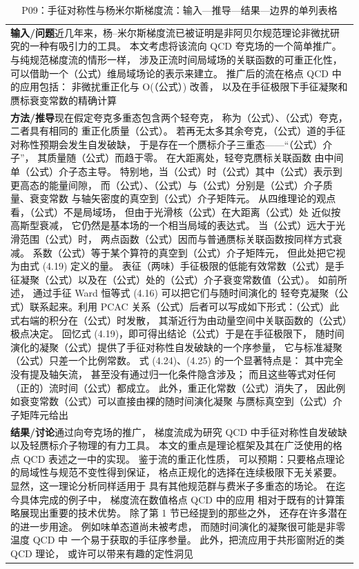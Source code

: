 \documentclass[UTF8,11pt,oneside]{ctexbook}
\begin{document}
\begin{table}[htbp]
  \centering
  \caption*{P09：手征对称性与杨米尔斯梯度流：输入—推导—结果—边界的单列表格}
  \small
  \begin{tabular}{@{}p{}@{}}
    \toprule
    \textbf{输入/问题}\quad 近几年来，杨–米尔斯梯度流已被证明是非阿贝尔规范理论非微扰研究的一种有吸引力的工具。 本文考虑将该流向 QCD 夸克场的一个简单推广。 与纯规范梯度流的情形一样， 涉及正流时间局域场的关联函数的可重正化性， 可以借助一个（公式）维局域场论的表示来建立。 推广后的流在格点 QCD 中的应用包括： 非微扰重正化与 O(（公式）) 改善， 以及在手征极限下手征凝聚和赝标衰变常数的精确计算 \\
    \textbf{方法/推导}\quad 现在假定夸克多重态包含两个轻夸克， 称为（公式）、（公式）夸克，二者具有相同的 重正化质量（公式）。 若再无太多其余夸克，（公式）道的手征对称性预期会发生自发破缺， 于是存在一个赝标介子三重态——``（公式）介子''， 其质量随（公式）而趋于零。 在大距离处，轻夸克赝标关联函数 由中间单（公式）介子态主导。 特别地，当（公式）时（公式）其中（公式）表示到更高态的能量间隙， 而（公式）、（公式）与（公式）分别是（公式）介子质量、衰变常数 与轴矢密度的真空到（公式）介子矩阵元。 从四维理论的观点看，（公式）不是局域场， 但由于光滑核（公式）在大距离（公式）处 近似按高斯型衰减， 它仍然是基本场的一个相当局域的表达式。 当（公式）远大于光滑范围（公式）时， 两点函数（公式）因而与普通赝标关联函数按同样方式衰减。 系数（公式）等于某个算符的真空到（公式）介子矩阵元， 但此处把它视为由式 (4.19) 定义的量。 表征（两味）手征极限的低能有效常数（公式）是手征凝聚（公式）以及在（公式）处的（公式）介子衰变常数值（公式）。 如前所述， 通过手征 Ward 恒等式 (4.16) 可以把它们与随时间演化的 轻夸克凝聚（公式）联系起来。利用 PCAC 关系（公式）后者可以写成如下形式：（公式）此式右端的积分在（公式）时发散， 其渐近行为由动量空间中关联函数的（公式）极点决定。 回忆式 (4.19)，即可得出结论（公式）于是在手征极限下， 随时间演化的凝聚（公式）提供了手征对称性自发破缺的一个序参量， 它与标准凝聚（公式）只差一个比例常数。 式 (4.24)、(4.25) 的一个显著特点是： 其中完全没有提及轴矢流， 甚至没有通过归一化条件隐含涉及； 而且这些等式对任何（正的）流时间（公式）都成立。 此外，重正化常数（公式）消失了， 因此例如衰变常数（公式）可以直接由裸的随时间演化凝聚 与赝标真空到（公式）介子矩阵元给出 \\
    \textbf{结果/讨论}\quad 通过向夸克场的推广， 梯度流成为研究 QCD 中手征对称性自发破缺 以及轻赝标介子物理的有力工具。 本文的重点是理论框架及其在广泛使用的格点 QCD 表述之一中的实现。 鉴于流的重正化性质， 可以预期：只要格点理论的局域性与规范不变性得到保证， 格点正规化的选择在连续极限下无关紧要。 显然，这一理论分析同样适用于 具有其他规范群与费米子多重态的场论。 在迄今具体完成的例子中， 梯度流在数值格点 QCD 中的应用 相对于既有的计算策略展现出重要的技术优势。 除了第 1 节已经提到的那些之外， 还存在许多潜在的进一步用途。 例如味单态道尚未被考虑， 而随时间演化的凝聚很可能是非零温度 QCD 中 一个易于获取的手征序参量。 此外，把流应用于共形窗附近的类 QCD 理论， 或许可以带来有趣的定性洞见 \\

\end{tabular}
\end{table}
\end{document}
